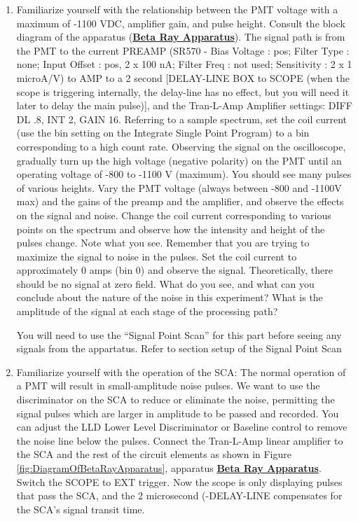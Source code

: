 \documentclass{../lab}
\begin{document}
\begin{enumerate}
    \item Familiarize yourself with the relationship between the PMT voltage with a maximum of -1100 VDC, amplifier gain, and pulse height. Consult the block diagram of the apparatus (\href{http://experimentationlab.berkeley.edu/sites/default/files/images/BRAimage010.gif}{\textbf{Beta Ray Apparatus}}). The signal path is from the PMT to the current PREAMP (SR570 - Bias Voltage : pos; Filter Type : none; Input Offset : pos, 2 x 100 nA; Filter Freq : not used; Sensitivity : 2 x 1 microA/V) to AMP to a 2 second [DELAY-LINE BOX to SCOPE (when the scope is triggering internally, the delay-line has no effect, but you will need it later to delay the main pulse)], and the Tran-L-Amp Amplifier settings: DIFF DL .8, INT 2, GAIN 16. Referring to a sample spectrum, set the coil current (use the bin setting on the Integrate Single Point Program) to a bin corresponding to a high count rate. Observing the signal on the oscilloscope, gradually turn up the high voltage (negative polarity) on the PMT until an operating voltage of -800 to -1100 V (maximum). You should see many pulses of various heights. Vary the PMT voltage (always between -800 and -1100V max) and the gains of the preamp and the amplifier, and observe the effects on the signal and noise. Change the coil current corresponding to various points on the spectrum and observe how the intensity and height of the pulses change. Note what you see. Remember that you are trying to maximize the signal to noise in the pulses. Set the coil current to approximately 0 amps (bin 0) and observe the signal. Theoretically, there should be no signal at zero field. What do you see, and what can you conclude about the nature of the noise in this experiment? What is the amplitude of the signal at each stage of the processing path?

    You will need to use the ``Signal Point Scan'' for this part before seeing any signals from the appartatus. Refer to section setup of the Signal Point Scan

    \item Familiarize yourself with the operation of the SCA: The normal operation of a PMT will result in small-amplitude noise pulses. We want to use the discriminator on the SCA to reduce or eliminate the noise, permitting the signal pulses which are larger in amplitude to be passed and recorded. You can adjust the LLD Lower Level Discriminator or Baseline control to remove the noise line below the pulses. Connect the Tran-L-Amp linear amplifier to the SCA and the rest of the circuit elements as shown in Figure \ref{fig:DiagramOfBetaRayApparatus}, apparatus \href{http://experimentationlab.berkeley.edu/sites/default/files/images/BRAimage010.gif}{\textbf{Beta Ray Apparatus}}. Switch the SCOPE to EXT trigger. Now the scope is only displaying pulses that pass the SCA, and the 2 microsecond (-DELAY-LINE compensates for the SCA's signal transit time.


\end{enumerate}
\end{document}
